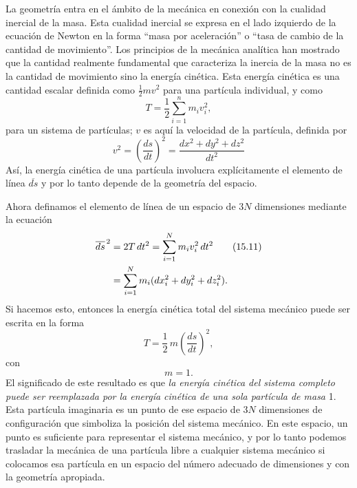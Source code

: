 \documentclass[12pt,a4paper]{book}
\begin{document}
\begin{center}
La geometr\'ia entra en el \'ambito de la mec\'anica en conexi\'on con la cualidad inercial de la masa. Esta cualidad inercial se expresa en el lado izquierdo de la ecuaci\'on de Newton en la forma ``masa por aceleraci\'on'' o ``tasa de cambio de la cantidad de movimiento''. Los principios de la mec\'anica anal\'itica han mostrado que la cantidad realmente fundamental que caracteriza la inercia de la masa no es la cantidad de movimiento sino la energ\'ia cin\'etica. Esta energ\'ia cin\'etica es una cantidad escalar definida como $\frac{1}{2}mv^2$ para una part\'icula individual, y como
\begin{equation}
T = \frac{1}{2}\sum_{i=1}^{n} m_i v_i^2,
\tag{15.9}
\end{equation}
para un sistema de part\'iculas; $v$ es aqu\'i la velocidad de la part\'icula, definida por
\begin{equation}
v^2 = \left(\frac{ds}{dt}\right)^2 = \frac{dx^2 + dy^2 + dz^2}{dt^2}
\tag{15.10}
\end{equation}
As\'i, la energ\'ia cin\'etica de una part\'icula involucra expl\'icitamente el elemento de l\'inea $\overline{ds}$ y por lo tanto depende de la geometr\'ia del espacio.

Ahora definamos el elemento de l\'inea de un espacio de $3N$ dimensiones mediante la ecuaci\'on
\begin{align}
\overline{ds}^{\,2} &= 2T\,dt^2 = \sum_{i=1}^{N} m_i v_i^2\,dt^2 \tag{15.11}\\
&= \sum_{i=1}^{N} m_i(dx_i^2 + dy_i^2 + dz_i^2). \notag
\end{align}
Si hacemos esto, entonces la energ\'ia cin\'etica total del sistema mec\'anico puede ser escrita en la forma
\begin{equation}
T = \frac{1}{2}\,m\left(\frac{ds}{dt}\right)^2,
\tag{15.12}
\end{equation}
con
\begin{equation}
m = 1.
\tag{15.13}
\end{equation}
El significado de este resultado es que \textit{la energ\'ia cin\'etica del sistema completo puede ser reemplazada por la energ\'ia cin\'etica de una sola part\'icula de masa} 1. Esta part\'icula imaginaria es un punto de ese espacio de $3N$ dimensiones de configuraci\'on que simboliza la posici\'on del sistema mec\'anico. En este espacio, un punto es suficiente para representar el sistema mec\'anico, y por lo tanto podemos trasladar la mec\'anica de una part\'icula libre a cualquier sistema mec\'anico si colocamos esa part\'icula en un espacio del n\'umero adecuado de dimensiones y con la geometr\'ia apropiada.


\end{center}
\end{document}
